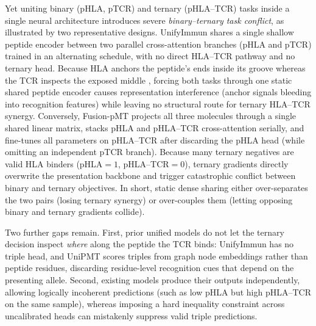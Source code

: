 \documentclass[webpdf,modern,large,namedate]{oup-authoring-template}
\theoremstyle{thmstyleone}
\theoremstyle{thmstyletwo}
\theoremstyle{thmstylethree}
\newcommand{\PH}{pHLA}
\newcommand{\PT}{pTCR}
\newcommand{\PHT}{pHLA--TCR}
\begin{document}
Yet uniting binary (\PH{}, \PT{}) and ternary (\PHT{}) tasks inside a single
neural architecture introduces severe \emph{binary--ternary task conflict}, as
illustrated by two representative designs. UnifyImmun \citep{yu2025unifyimmun}
shares a single shallow peptide encoder between two parallel cross-attention
branches (\PH{} and \PT{}) trained in an alternating schedule, with no direct
HLA--TCR pathway and no ternary head. Because HLA anchors the peptide's ends
inside its groove whereas the TCR inspects the exposed middle
\citep{rudolph2006structural}, forcing both tasks through one static shared
peptide encoder causes representation interference (anchor signals bleeding
into recognition features) while leaving no structural route for ternary
HLA--TCR synergy. Conversely, Fusion-pMT \citep{ma2025fusionpmt} projects all
three molecules through a single shared linear matrix, stacks \PH{} and \PHT{}
cross-attention serially, and fine-tunes all parameters on \PHT{} after
discarding the \PH{} head (while omitting an independent \PT{} branch). Because
many ternary negatives are valid HLA binders (\PH{}$=1$, \PHT{}$=0$), ternary
gradients directly overwrite the presentation backbone and trigger catastrophic
conflict between binary and ternary objectives. In short, static dense sharing
either over-separates the two pairs (losing ternary synergy) or over-couples
them (letting opposing binary and ternary gradients collide).

Two further gaps remain. First, prior unified models do not let the ternary
decision inspect \emph{where} along the peptide the TCR binds: UnifyImmun has
no triple head, and UniPMT scores triples from graph node embeddings rather
than peptide residues, discarding residue-level recognition cues that depend on
the presenting allele. Second, existing models produce their outputs
independently, allowing logically incoherent predictions (such as low \PH{} but
high \PHT{} on the same sample), whereas imposing a hard inequality constraint
across uncalibrated heads can mistakenly suppress valid triple predictions.
\end{document}

